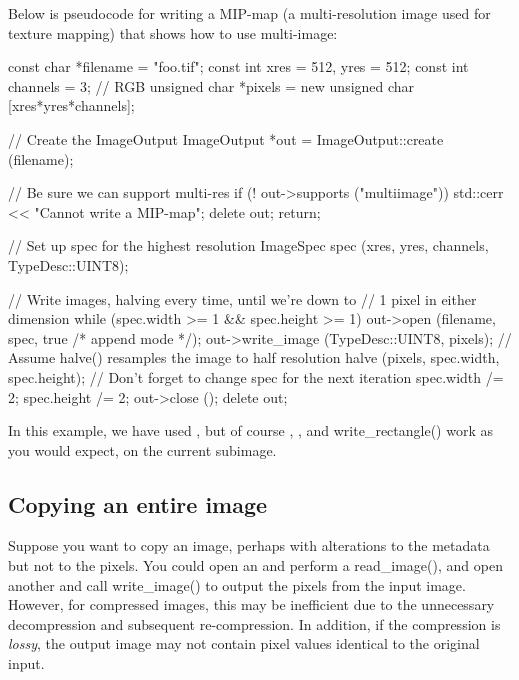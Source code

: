 Below is pseudocode for writing a MIP-map (a multi-resolution image
used for texture mapping) that shows how to use multi-image:

\begin{code}
        const char *filename = "foo.tif";
        const int xres = 512, yres = 512;
        const int channels = 3;  // RGB
        unsigned char *pixels = new unsigned char [xres*yres*channels];

        // Create the ImageOutput
        ImageOutput *out = ImageOutput::create (filename);

        // Be sure we can support multi-res
        if (! out->supports ("multiimage")) {
            std::cerr << "Cannot write a MIP-map\n";
            delete out;
            return;
        }

        // Set up spec for the highest resolution
        ImageSpec spec (xres, yres, channels, TypeDesc::UINT8);

        // Write images, halving every time, until we're down to
        // 1 pixel in either dimension
        while (spec.width >= 1 && spec.height >= 1) {
            out->open (filename, spec, true /* append mode */);
            out->write_image (TypeDesc::UINT8, pixels);
            // Assume halve() resamples the image to half resolution
            halve (pixels, spec.width, spec.height);
            // Don't forget to change spec for the next iteration
            spec.width /= 2;
            spec.height /= 2;
        }
        out->close ();
        delete out;
\end{code}

In this example, we have used \writeimage, but of course \writescanline,
\writetile, and {\cf write_rectangle()} work as you would expect, on the
current subimage.

\subsection{Copying an entire image}
\label{sec:imageoutput:copyimage}

Suppose you want to copy an image, perhaps with alterations to the 
metadata but not to the pixels.  You could open an \ImageInput and
perform a {\cf read_image()}, and open another \ImageOutput and
call {\cf write_image()} to output the pixels from the input image.
However, for compressed images, this may be inefficient due to the
unnecessary decompression and subsequent re-compression.  In addition,
if the compression is \emph{lossy}, the output image may not contain
pixel values identical to the original input.

